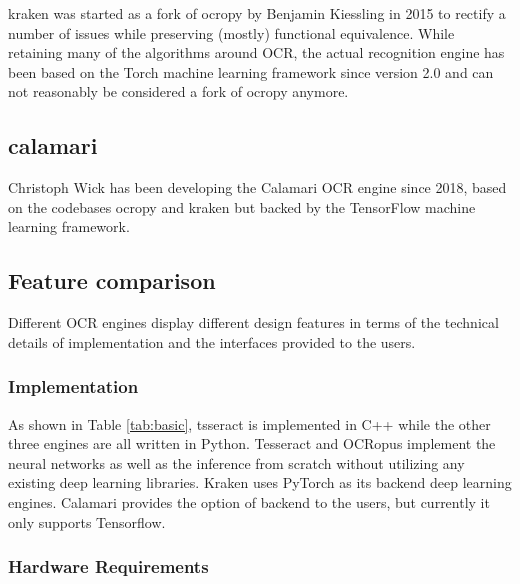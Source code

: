 \documentclass[conference]{IEEEtran}
\begin{document}
kraken \cite{DBLP:journals/corr/RomanovMSK17} was started as a fork of ocropy by Benjamin Kiessling in 2015 to rectify a number of issues while preserving (mostly) functional equivalence. While retaining many of the algorithms around OCR, the actual recognition engine has been based on the Torch machine learning framework since version 2.0 and can not reasonably be considered a fork of ocropy anymore.

\subsection*{calamari}

Christoph Wick has been developing the Calamari \cite{DBLP:journals/corr/abs-1807-02004}
OCR engine since 2018, based on the codebases ocropy and kraken but backed by the
TensorFlow machine learning framework.

\subsection*{Feature comparison}


Different OCR engines display different design features in terms of the technical details of implementation and the interfaces provided to the users. 

\subsubsection*{Implementation}

As shown in Table \ref{tab:basic}, tsseract is implemented in C++ while the  
other three engines are all written in Python. Tesseract and OCRopus   
implement the neural networks as well as the inference from scratch without 
utilizing any existing deep learning libraries. Kraken uses PyTorch as its   
backend deep learning engines. Calamari provides the option of backend to the
users, but currently it only supports Tensorflow.                            

\subsubsection*{Hardware Requirements}
\end{document}
